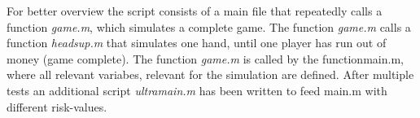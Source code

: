 \documentclass[11pt]{article}
\begin{document}
\begin{minipage}{0.48\textwidth}
For better overview the script consists of a main file that repeatedly calls a function \textit{game.m}, which simulates a complete game. The function \textit{game.m} calls a function \textit{headsup.m} that simulates one hand, until one player has run out of money (game complete). The function \textit{game.m} is called by the function{main.m}, where all relevant variabes, relevant for the simulation are defined.
After multiple tests an additional script \textit{ultramain.m} has been written to feed {main.m} with different risk-values.\\
\end{minipage}





%
\end{document}
